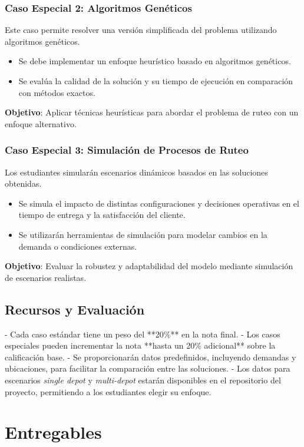 \documentclass[12pt]{article}
\begin{document}
\subsubsection{Caso Especial 2: Algoritmos Genéticos}
Este caso permite resolver una versión simplificada del problema utilizando algoritmos genéticos.
\begin{itemize}
    \item Se debe implementar un enfoque heurístico basado en algoritmos genéticos.
    \item Se evalúa la calidad de la solución y su tiempo de ejecución en comparación con métodos exactos.
\end{itemize}
\textbf{Objetivo}: Aplicar técnicas heurísticas para abordar el problema de ruteo con un enfoque alternativo.

\subsubsection{Caso Especial 3: Simulación de Procesos de Ruteo}
Los estudiantes simularán escenarios dinámicos basados en las soluciones obtenidas.
\begin{itemize}
    \item Se simula el impacto de distintas configuraciones y decisiones operativas en el tiempo de entrega y la satisfacción del cliente.
    \item Se utilizarán herramientas de simulación para modelar cambios en la demanda o condiciones externas.
\end{itemize}
\textbf{Objetivo}: Evaluar la robustez y adaptabilidad del modelo mediante simulación de escenarios realistas.

\subsection{Recursos y Evaluación}
- Cada caso estándar tiene un peso del **20\%** en la nota final.
- Los casos especiales pueden incrementar la nota **hasta un 20\% adicional** sobre la calificación base.
- Se proporcionarán datos predefinidos, incluyendo demandas y ubicaciones, para facilitar la comparación entre las soluciones.
- Los datos para escenarios \textit{single depot} y \textit{multi-depot} estarán disponibles en el repositorio del proyecto, permitiendo a los estudiantes elegir su enfoque.
\bigskip

\section{Entregables}
\end{document}
